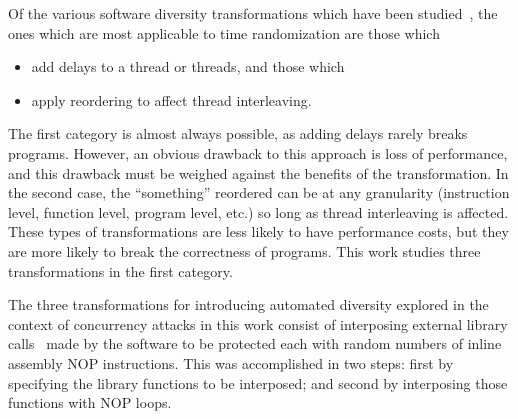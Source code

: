 Of the various software diversity transformations which have been studied~\cite{Larsen2014}, the ones which are most applicable to time randomization are those which
\begin{itemize}
	\item add delays to a thread or threads, and those which
	\item apply reordering to affect thread interleaving.
\end{itemize}
The first category is almost always possible, as adding delays rarely breaks programs.
However, an obvious drawback to this approach is loss of performance, and this drawback must be weighed against the benefits of the transformation.
In the second case, the ``something'' reordered can be at any granularity (instruction level, function level, program level, etc.) so long as thread interleaving is affected.
These types of transformations are less likely to have performance costs, but they are more likely to break the correctness of programs.
This work studies three transformations in the first category.

The three transformations for introducing automated diversity explored in the context of concurrency attacks in this work consist of interposing external library calls~\cite{Conrod2009} made by the software to be protected each with random numbers of inline assembly NOP instructions.
This was accomplished in two steps: first by specifying the library functions to be interposed; and second by interposing those functions with NOP loops.
